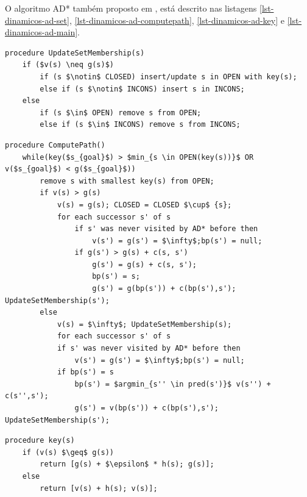 O algoritmo AD* também proposto em , está descrito nas listagens \ref{lst-dinamicos-ad-set}, \ref{lst-dinamicos-ad-computepath}, \ref{lst-dinamicos-ad-key} e \ref{lst-dinamicos-ad-main}.

\begin{lstlisting}[mathescape, label=lst-dinamicos-ad-set, caption=Algoritmo AD* - função para determinar o conjunto ao qual vértice pertencerá, float=htpb]
procedure UpdateSetMembership(s)
	if ($v(s) \neq g(s)$)
		if (s $\notin$ CLOSED) insert/update s in OPEN with key(s);
		else if (s $\notin$ INCONS) insert s in INCONS;
	else
		if (s $\in$ OPEN) remove s from OPEN;
		else if (s $\in$ INCONS) remove s from INCONS;
\end{lstlisting}

\begin{lstlisting}[mathescape, label=lst-dinamicos-ad-computepath, caption=Algoritmo AD* - função de cálculo de caminho, float=htpb]
procedure ComputePath()
	while(key($s_{goal}$) > $min_{s \in OPEN(key(s))}$ OR v($s_{goal}$) < g($s_{goal}$)) 
		remove s with smallest key(s) from OPEN;
		if v(s) > g(s)
			v(s) = g(s); CLOSED = CLOSED $\cup$ {s};
			for each successor s' of s
				if s' was never visited by AD* before then
					v(s') = g(s') = $\infty$;bp(s') = null;
				if g(s') > g(s) + c(s, s')
					g(s') = g(s) + c(s, s');
					bp(s') = s;
					g(s') = g(bp(s')) + c(bp(s'),s'); UpdateSetMembership(s');
		else
			v(s) = $\infty$; UpdateSetMembership(s);
			for each successor s' of s
			if s' was never visited by AD* before then
				v(s') = g(s') = $\infty$;bp(s') = null;
			if bp(s') = s
				bp(s') = $argmin_{s'' \in pred(s')}$ v(s'') + c(s'',s');
				g(s') = v(bp(s')) + c(bp(s'),s'); UpdateSetMembership(s');
\end{lstlisting}

\begin{lstlisting}[mathescape, label=lst-dinamicos-ad-key, caption=Algoritmo AD* - função da chave ordenadora da fila de prioridades, float=htpb]
procedure key(s)
	if (v(s) $\geq$ g(s))
		return [g(s) + $\epsilon$ * h(s); g(s)];
	else
		return [v(s) + h(s); v(s)];
\end{lstlisting}

